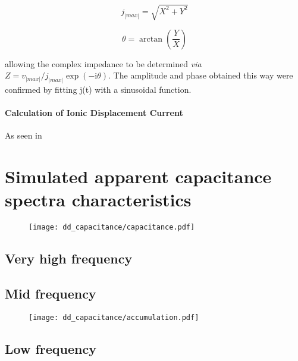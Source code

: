 \begin{equation}
j_|max| = \sqrt{X^2 + Y^2}
\end{equation}

\begin{equation}
\theta = \arctan(\frac{Y}{X})
\end{equation}

allowing the complex impedance to be determined \textsl{via} $Z = v_|max| / j_|max| \exp(-\mathrm{i}\theta)$.
The amplitude and phase
obtained this way were confirmed by fitting j(t) with a sinusoidal function.

\paragraph{Calculation of Ionic Displacement Current}\label{displacement_current_ionic}
As seen in 

\section{Simulated apparent capacitance spectra characteristics}

\begin{figure}
	\centering
	\texttt{[image: dd\_capacitance/capacitance.pdf]}
	\label{fig:impedance-capacitance}
\end{figure}

\subsection{Very high frequency}



\subsection{Mid frequency}
\begin{figure}
	\centering
	\texttt{[image: dd\_capacitance/accumulation.pdf]}
	\label{fig:impedance-accumulation}
\end{figure}

\subsection{Low frequency}

